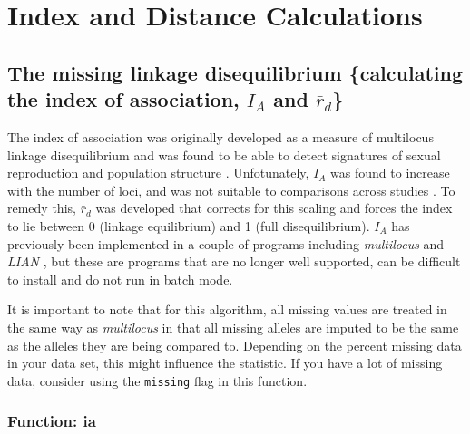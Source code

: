 \documentclass[letterpaper]{article}
\newcommand{\tab}{\hspace*{1em}}
\begin{document}
\section{Index and Distance Calculations}\label{index}
\subsection{The missing linkage disequilibrium \{calculating the index of association, $I_A$ and $\bar r_d$\}}\label{index:iard}

\tab\tab The index of association was originally developed as a measure of multilocus linkage disequilibrium \cite{Brown:1980} and was found to be able to detect signatures of sexual reproduction and population structure \cite{Brown:1980, Smith:1993}. Unfotunately, $I_A$ was found to increase with the number of loci, and was not suitable to comparisons across studies \cite{Agapow:2001}. To remedy this, $\bar{r}_d$ was developed that corrects for this scaling and forces the index to lie between 0 (linkage equilibrium) and 1 (full disequilibrium). $I_A$ has previously been implemented in a couple of programs including \textit{multilocus} \cite{Agapow:2001} and \textit{LIAN} \cite{Haubold:2000}, but these are programs that are no longer well supported, can be difficult to install and do not run in batch mode. 

It is important to note that for this algorithm, all missing values are treated in the same way as \textit{multilocus} in that all missing alleles are imputed to be the same as the alleles they are being compared to. Depending on the percent missing data in your data set, this might influence the statistic. If you have a lot of missing data, consider using the \texttt{missing} flag in this function.
\subsubsection{Function: ia}\label{index:iard:ia}
\end{document}
